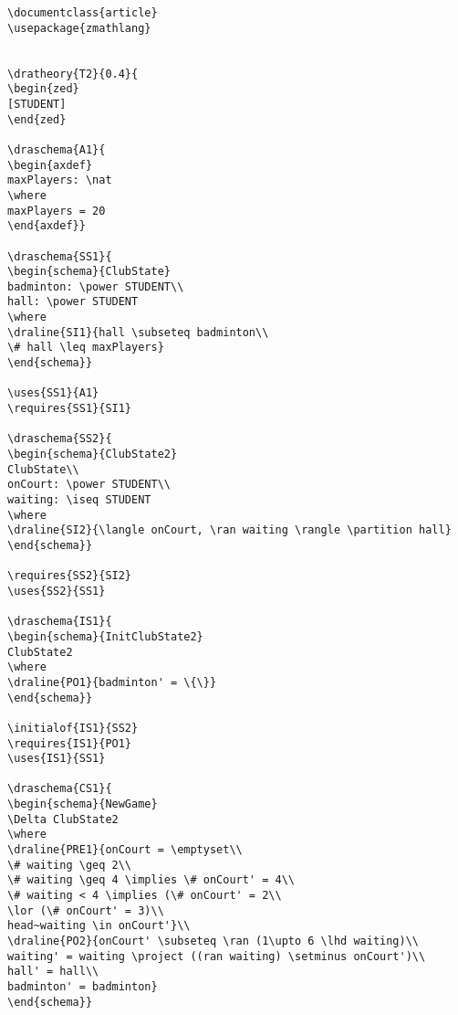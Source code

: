 \begin{verbatim}
\documentclass{article}
\usepackage{zmathlang}


\dratheory{T2}{0.4}{
\begin{zed}
[STUDENT]
\end{zed}

\draschema{A1}{
\begin{axdef}
maxPlayers: \nat
\where
maxPlayers = 20
\end{axdef}}

\draschema{SS1}{
\begin{schema}{ClubState}
badminton: \power STUDENT\\
hall: \power STUDENT
\where
\draline{SI1}{hall \subseteq badminton\\
\# hall \leq maxPlayers}
\end{schema}}

\uses{SS1}{A1}
\requires{SS1}{SI1}

\draschema{SS2}{
\begin{schema}{ClubState2}
ClubState\\
onCourt: \power STUDENT\\
waiting: \iseq STUDENT
\where
\draline{SI2}{\langle onCourt, \ran waiting \rangle \partition hall}
\end{schema}}

\requires{SS2}{SI2}
\uses{SS2}{SS1}

\draschema{IS1}{
\begin{schema}{InitClubState2}
ClubState2
\where
\draline{PO1}{badminton' = \{\}}
\end{schema}}

\initialof{IS1}{SS2}
\requires{IS1}{PO1}
\uses{IS1}{SS1}

\draschema{CS1}{
\begin{schema}{NewGame}
\Delta ClubState2
\where
\draline{PRE1}{onCourt = \emptyset\\
\# waiting \geq 2\\
\# waiting \geq 4 \implies \# onCourt' = 4\\
\# waiting < 4 \implies (\# onCourt' = 2\\
\lor (\# onCourt' = 3)\\
head~waiting \in onCourt'}\\
\draline{PO2}{onCourt' \subseteq \ran (1\upto 6 \lhd waiting)\\
waiting' = waiting \project ((ran waiting) \setminus onCourt')\\
hall' = hall\\
badminton' = badminton}
\end{schema}}


\end{verbatim}
